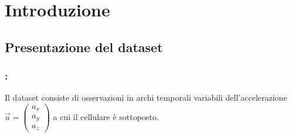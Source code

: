 \documentclass[beamer]{standalone}
\begin{document}
\section{Introduzione}
\subsection{Presentazione del dataset}
\begin{frame}
\frametitle{\secname : \subsecname}
Il dataset consiste di osservazioni in archi temporali variabili dell'accelerazione $\vec{a} = \begin{pmatrix}
a_x \\ a_y \\ a_z
\end{pmatrix}$ a cui il cellulare è sottoposto.
\end{frame}
\end{document}
